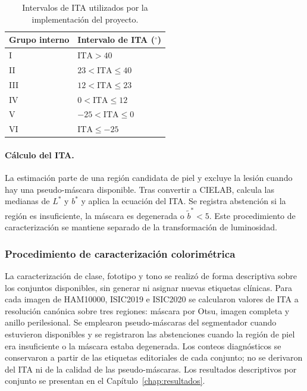\begin{table}[!htbp]
\centering
\begingroup\fontsize{11}{13}\selectfont\singlespacing
\caption{Intervalos de ITA utilizados por la implementación del proyecto.}
\label{tab:intervalos-ita-implementados}
\begin{tabularx}{\textwidth}{@{}L L@{}}
\toprule
Grupo interno & Intervalo de ITA ($^\circ$) \\
\midrule
I & $\mathrm{ITA}>40$ \\
II & $23<\mathrm{ITA}\leq40$ \\
III & $12<\mathrm{ITA}\leq23$ \\
IV & $0<\mathrm{ITA}\leq12$ \\
V & $-25<\mathrm{ITA}\leq0$ \\
VI & $\mathrm{ITA}\leq-25$ \\
\bottomrule
\end{tabularx}\par
\par\smallskip\raggedright
\par{}
\par\endgroup
\end{table}

\paragraph{Cálculo del ITA.}\label{alg:estimacion-ita}
La estimación parte de una región candidata de piel y excluye la lesión cuando hay una pseudo-máscara disponible. Tras convertir a CIELAB, calcula las medianas de $L^*$ y $b^*$ y aplica la ecuación del ITA. Se registra abstención si la región es insuficiente, la máscara es degenerada o $\widetilde b^*<5$. Este procedimiento de caracterización se mantiene separado de la transformación de luminosidad.


\subsubsection{Procedimiento de caracterización colorimétrica}

La caracterización de clase, fototipo y tono se realizó de forma descriptiva sobre los conjuntos disponibles, sin generar ni asignar nuevas etiquetas clínicas. Para cada imagen de HAM10000, ISIC2019 e ISIC2020 se calcularon valores de ITA a resolución canónica sobre tres regiones: máscara por Otsu, imagen completa y anillo perilesional. Se emplearon pseudo-máscaras del segmentador cuando estuvieron disponibles y se registraron las abstenciones cuando la región de piel era insuficiente o la máscara estaba degenerada. Los conteos diagnósticos se conservaron a partir de las etiquetas editoriales de cada conjunto; no se derivaron del ITA ni de la calidad de las pseudo-máscaras. Los resultados descriptivos por conjunto se presentan en el Capítulo~\ref{chap:resultados}.


